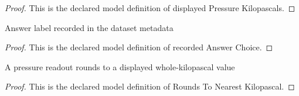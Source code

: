 \begin{proof}
  This is the declared model definition of displayed Pressure Kilopascals.
\end{proof}
\begin{definition}
  \label{def:physics:phyx-mini-0394:phyxminiproblems-problemphyxmini0394-recordedanswerchoice}
  Answer label recorded in the dataset metadata
\end{definition}
\begin{proof}
  This is the declared model definition of recorded Answer Choice.
\end{proof}
\begin{definition}
  \label{def:physics:phyx-mini-0394:phyxminiproblems-problemphyxmini0394-roundstonearestkilopascal}
  A pressure readout rounds to a displayed whole-kilopascal value
\end{definition}
\begin{proof}
  This is the declared model definition of Rounds To Nearest Kilopascal.
\end{proof}
